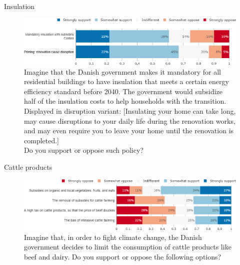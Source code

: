 \documentclass[aspectratio=169,9pt,dvipsnames]{beamer}
\begin{document}
\begin{frame}{Insulation}%
\vspace{-.5cm}
\begin{figure}[h!]
\caption{Imagine that the Danish government makes it mandatory for all residential buildings to have insulation that meets a certain energy efficiency standard before 2040. The government would subsidize half of the insulation costs to help households with the transition. \\
Displayed in disruption variant: [Insulating your home can take long, may cause disruptions to your daily life during the renovation works, and may even require you to leave your home until the renovation is completed.]  \\
Do you support or oppose such policy? }
\includegraphics[width=.9\textwidth]{../figures/DK/insulation_support_variant_DK.png} 
\end{figure}
\end{frame}

\begin{frame}{Cattle products}%
\vspace{-.5cm}
\begin{figure}[h!]
\caption{Imagine that, in order to fight climate change, the Danish government decides to limit the consumption of cattle products like beef and dairy.
Do you support or oppose the following options?}
\includegraphics[width=1\textwidth]{../figures/DK/beef_DK.png} 
\end{figure}
\end{frame}
\end{document}
